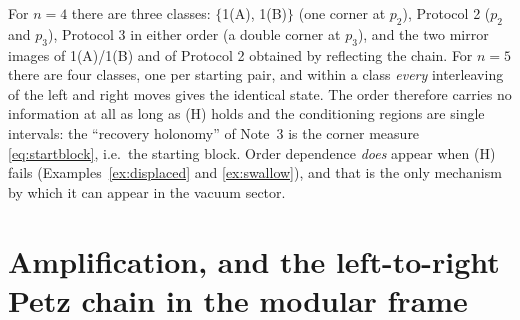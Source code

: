 \documentclass[11pt]{article}
\theoremstyle{definition}\newtheorem{example}[theorem]{Example}
\begin{document}
\begin{remark}\label{rem:coincide}
For $n=4$ there are three classes: $\{$1(A), 1(B)$\}$ (one corner at $p_2$), Protocol 2 ($p_2$ and
$p_3$), Protocol 3 in either order (a double corner at $p_3$), and the two mirror images of
1(A)/1(B) and of Protocol 2 obtained by reflecting the chain.  For $n=5$ there are four classes,
one per starting pair, and within a class \emph{every} interleaving of the left and right moves
gives the identical state.  The order therefore carries no information at all as long as (H)
holds and the conditioning regions are single intervals: the ``recovery holonomy'' of Note~3 is
the corner measure \eqref{eq:startblock}, i.e.\ the starting block.  Order dependence
\emph{does} appear when (H) fails (Examples~\ref{ex:displaced} and \ref{ex:swallow}), and that is
the only mechanism by which it can appear in the vacuum sector.
\end{remark}

\section{Amplification, and the left-to-right Petz chain in the modular frame}\label{sec:ampl}
\end{document}

